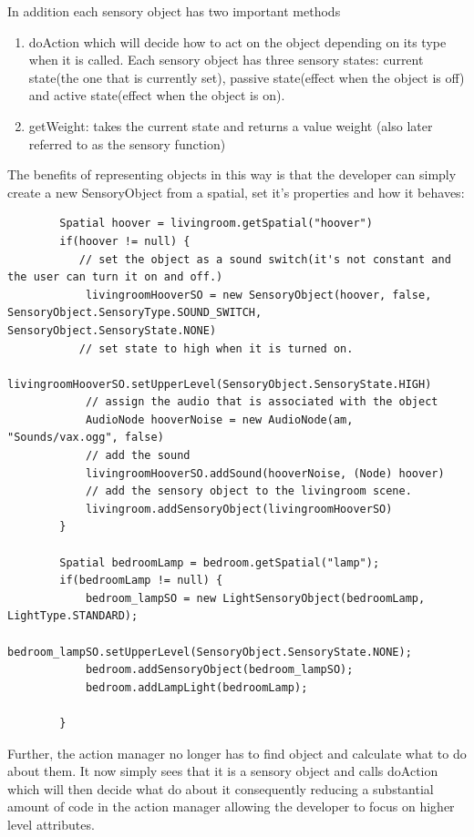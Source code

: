 \documentclass[11pt]{report}
\begin{document}
In addition each sensory object has two important methods
\begin{enumerate}
\item  doAction which will decide how to act on the object depending on its type when it is called. Each sensory object has three sensory states: current state(the one that is currently set), passive state(effect when the object is off) and active state(effect when the object is on). 
\item getWeight: takes the current state and returns a value weight (also later referred to as the sensory function)
\end{enumerate}

The benefits of representing objects in this way is that the developer can simply create a new SensoryObject from a spatial, set it's properties and how it behaves:

\begin{lstlisting}
        Spatial hoover = livingroom.getSpatial("hoover")
        if(hoover != null) {
           // set the object as a sound switch(it's not constant and the user can turn it on and off.)
            livingroomHooverSO = new SensoryObject(hoover, false, SensoryObject.SensoryType.SOUND_SWITCH, SensoryObject.SensoryState.NONE)
           // set state to high when it is turned on.
            livingroomHooverSO.setUpperLevel(SensoryObject.SensoryState.HIGH)
            // assign the audio that is associated with the object
            AudioNode hooverNoise = new AudioNode(am, "Sounds/vax.ogg", false)
            // add the sound
            livingroomHooverSO.addSound(hooverNoise, (Node) hoover)
            // add the sensory object to the livingroom scene. 
            livingroom.addSensoryObject(livingroomHooverSO)
        } 
        
        Spatial bedroomLamp = bedroom.getSpatial("lamp");
        if(bedroomLamp != null) {     
            bedroom_lampSO = new LightSensoryObject(bedroomLamp, LightType.STANDARD);
            bedroom_lampSO.setUpperLevel(SensoryObject.SensoryState.NONE);
            bedroom.addSensoryObject(bedroom_lampSO);
            bedroom.addLampLight(bedroomLamp);
            
        }    
\end{lstlisting}

Further, the action manager no longer has to find object and calculate what to do about them. It now simply sees that it is a sensory object and calls doAction which will then decide what do about it consequently reducing a substantial amount of code in the action manager allowing the developer to focus on higher level attributes. 
\end{document}
